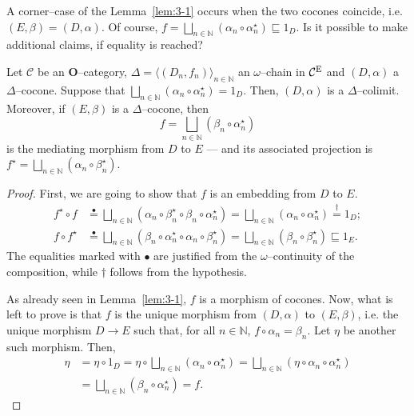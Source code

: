 A corner--case of the Lemma~\ref{lem:3-1} occurs when the two cocones coincide, i.e. \((E,\beta) = (D,\alpha)\). %
Of course, \(f = \bigsqcup_{n \in \mathbb{N}}(\alpha_n \circ \alpha_n^\star) \sqsubseteq 1_D\).
Is it possible to make additional claims, if equality is reached?

\begin{thm}\label{thm:3-1}
  Let \(\mathcal{C}\) be an \(\mathbf{O}\)--category, \(\Delta = {\langle (D_n,f_n) \rangle}_{n \in \mathbb{N}}\) an \(\omega\)--chain in %
  \(\mathcal{C}^\textup{E}\) and \((D,\alpha)\) a \(\Delta\)--cocone. %
  Suppose that \(\bigsqcup_{n \in \mathbb{N}}(\alpha_n \circ \alpha_n^\star) = 1_D\).
  Then, \((D,\alpha)\) is a \(\Delta\)--colimit. %
  Moreover, if \((E,\beta)\) is a \(\Delta\)--cocone, then %
  \begin{equation*}
    f = \bigsqcup_{n \in \mathbb{N}}(\beta_n \circ \alpha_n^\star)
  \end{equation*}
  is the mediating morphism from \(D\) to \(E\) --- and its associated projection is \(f^\star = \bigsqcup_{n \in \mathbb{N}}(\alpha_n \circ \beta_n^\star)\).
\end{thm}
\begin{proof}
  First, we are going to show that \(f\) is an embedding from \(D\) to \(E\).
  \begin{align*}
    f^\star \circ f &\overset{\bullet}{=}
    \bigsqcup_{n \in \mathbb{N}}(\alpha_n \circ \beta_n^\star \circ \beta_n \circ \alpha_n^\star) =
    \bigsqcup_{n \in \mathbb{N}}(\alpha_n \circ \alpha_n^\star) \overset{\dagger}{=} 1_D; \\
    f \circ f^\star &\overset{\bullet}{=}
    \bigsqcup_{n \in \mathbb{N}}(\beta_n \circ \alpha_n^\star \circ \alpha_n \circ \beta_n^\star) =
    \bigsqcup_{n \in \mathbb{N}}(\beta_n \circ \beta_n^\star)
    \sqsubseteq 1_E.
  \end{align*}
  The equalities marked with \(\bullet\) are justified from the \(\omega\)--continuity of the composition, while \(\dagger\) follows from the hypothesis. %

  As already seen in Lemma~\ref{lem:3-1}, \(f\) is a morphism of cocones.
  Now, what is left to prove is that \(f\) is the unique morphism from \((D,\alpha)\) to \((E,\beta)\), i.e. the unique morphism \(D\to E\)  such that, for all \(n \in \mathbb{N}\), \(f \circ \alpha_n = \beta_n\).
  Let \(\eta\) be another such morphism. Then, %
  \begin{equation*}
    \begin{split}
      \eta &= \eta \circ 1_D
      = \eta \circ \bigsqcup_{n \in \mathbb{N}}(\alpha_n \circ \alpha_n^\star) = \bigsqcup_{n \in \mathbb{N}}(\eta \circ \alpha_n \circ \alpha_n^\star) \\
      &= \bigsqcup_{n \in \mathbb{N}}(\beta_n \circ \alpha_n^\star)
      = f.
    \end{split}
  \end{equation*} \qedhere
\end{proof}

